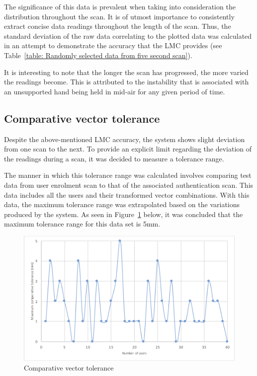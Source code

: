 The significance of this data is prevalent when taking into consideration the distribution throughout the scan. It is of utmost importance to consistently extract concise data readings throughout the length of the scan. Thus, the standard deviation of the raw data correlating to the plotted data was calculated in an attempt to demonstrate the accuracy that the LMC provides (see Table~\ref{table: Randomly selected data from five second scan}).

It is interesting to note that the longer the scan has progressed, the more varied the readings become. This is attributed to the instability that is associated with an unsupported hand being held in mid-air for any given period of time.

\subsection{Comparative vector tolerance}

Despite the above-mentioned LMC accuracy, the system shows slight deviation from one scan to the next. To provide an explicit limit regarding the deviation of the readings during a scan, it was decided to measure a tolerance range.

The manner in which this tolerance range was calculated involves comparing test data from user enrolment scan to that of the associated authentication scan. This data includes all the users and their transformed vector combinations. With this data, the maximum tolerance range was extrapolated based on the variations produced by the system. As seen in Figure~\ref{fig:Comparative vector tolerance} below, it was concluded that the maximum tolerance range for this data set is 5mm.

    
    \begin{figure}[htbp!] 
    \centering    
    \includegraphics[width=1.0\textwidth]{Chapter4/Figs/Comparative.png}
    \caption[Comparative vector tolerance]{Comparative vector tolerance}
    \label{fig:Comparative vector tolerance}
    \end{figure}

